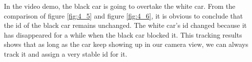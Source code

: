 \documentclass[10pt,twocolumn,letterpaper]{article}
\begin{document}
In the video demo, the black car is going to overtake the white car. From the comparison of figure \ref{fig:4_5} and figure \ref{fig:4_6}, it is obvious to conclude that the id of the black car remains unchanged. The white car’s id changed because it has disappeared for a while when the black car blocked it. This tracking results shows that as long as the car keep showing up in our camera view, we can always track it and assign a very stable id for it.

\newpage
{\small


}
\end{document}
